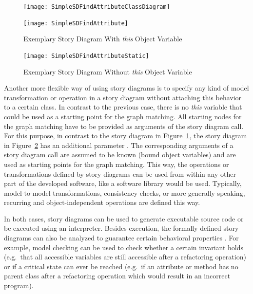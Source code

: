 \begin{figure}[htb]
	\centering
  \begin{minipage}[t]{.4\textwidth}
    \centering
    \texttt{[image: SimpleSDFindAttributeClassDiagram]} 
    \caption{Type Model for the Story Diagram in Figure~\ref{fig:SDWithThis}}
    \label{fig:SDWithThisClassDiagram}
  \end{minipage}%
  \hfill
  \begin{minipage}[t]{.55\textwidth}
    \centering
    \texttt{[image: SimpleSDFindAttribute]}
    \caption{Exemplary Story Diagram With \emph{this} Object Variable}
    \label{fig:SDWithThis}
  \end{minipage}
\end{figure}

\begin{figure}[htb]
	\centering
  \texttt{[image: SimpleSDFindAttributeStatic]} 
  \caption{Exemplary Story Diagram Without \emph{this} Object Variable}
  \label{fig:SDWithThisStatic}
\end{figure}

Another more flexible way of using story diagrams is to specify any kind of model transformation or operation in a story diagram without attaching this behavior to a certain class.
In contrast to the previous case, there is no \emph{this} variable that could be used as a starting point for the graph matching.
All starting nodes for the graph matching have to be provided as arguments of the story diagram call.
For this purpose, in contrast to the story diagram in Figure~\ref{fig:SDWithThis}, the story diagram in Figure~\ref{fig:SDWithThisStatic} has an additional parameter .
The corresponding arguments of a story diagram call are assumed to be known (bound object variables) and are used as starting points for the graph matching.
This way, the operations or transformations defined by story diagrams can be used from within any other part of the developed software, like a software library would be used.
Typically, model-to-model transformations, consistency checks, or more generally speaking, recurring and object-independent operations are defined this way.


In both cases, story diagrams can be used to generate executable source code or be executed using an interpreter.
Besides execution, the formally defined story diagrams can also be analyzed to guarantee certain behavioral properties \cite{Mey09,Zue09}.
For example, model checking can be used to check whether a certain invariant holds
(e.g.\ that all accessible variables are still accessible after a refactoring operation)
or if a critical state can ever be reached (e.g.\ if an attribute or method has no parent class after a refactoring operation which would result in an incorrect program).

